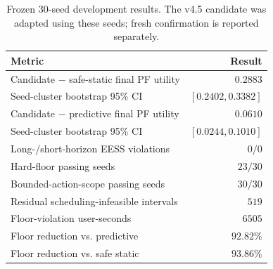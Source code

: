 \begin{table}[t]
\caption{Frozen 30-seed development results. The v4.5 candidate was adapted using these seeds; fresh confirmation is reported separately.}
\label{tab:development-key}
\centering
\footnotesize
\setlength{\tabcolsep}{3.2pt}
\renewcommand{\arraystretch}{1.08}
\begin{tabular}{@{}lr@{}}
\toprule
Metric & Result\\
\midrule
Candidate $-$ safe-static final PF utility & $0.2883$\\
Seed-cluster bootstrap 95\% CI & $[0.2402,0.3382]$\\
Candidate $-$ predictive final PF utility & $0.0610$\\
Seed-cluster bootstrap 95\% CI & $[0.0244,0.1010]$\\
Long-/short-horizon EESS violations & $0/0$\\
Hard-floor passing seeds & $23/30$\\
Bounded-action-scope passing seeds & $30/30$\\
Residual scheduling-infeasible intervals & $519$\\
Floor-violation user-seconds & $6505$\\
Floor reduction vs. predictive & $92.82\%$\\
Floor reduction vs. safe static & $93.86\%$\\
\bottomrule
\end{tabular}
\end{table}
